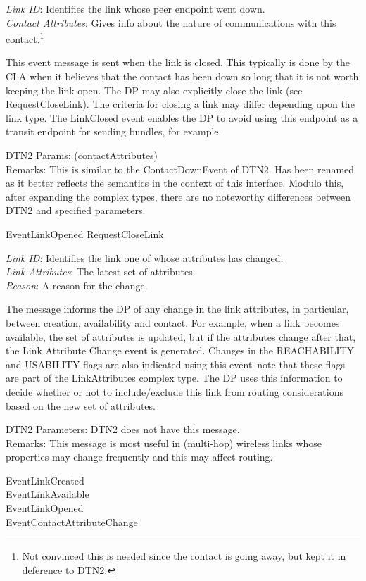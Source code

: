 {
\metP
    {\em Link ID}: Identifies the link whose peer endpoint went down.\\
    {\em Contact Attributes}: Gives info about the nature of communications 
    with this contact.\footnote{Not convinced this is
    needed since the contact is going away, but kept it in deference to DTN2.}

\metD
    This event message is sent when the link is closed. This typically
    is done by the CLA when it believes that the contact has been down
    so long that it is not worth keeping the link open. The DP may
    also explicitly close the link (see RequestCloseLink). The
    criteria for closing a link may differ depending upon the link
    type.  The LinkClosed event enables the DP to avoid using this
    endpoint as a transit endpoint for sending bundles, for example.

\metM
    DTN2 Params: (contactAttributes)\\
    Remarks: This is similar to the ContactDownEvent of DTN2. Has
    been renamed as it better reflects the semantics in the context of
    this interface. Modulo this, after expanding the complex types,
    there are no noteworthy differences between DTN2 and specified
    parameters.

\metR
    EventLinkOpened
    RequestCloseLink
}

    
{
\metP
    {\em Link ID}: Identifies the link one of whose attributes has changed.\\
    {\em Link Attributes}: The latest set of attributes.\\
    {\em Reason}: A reason for the change.

\metD
    The message informs the DP of any change in the link attributes,
    in particular, between creation, availability and contact. For
    example, when a link becomes available, the set of attributes is
    updated, but if the attributes change after that, the Link
    Attribute Change event is generated. Changes in the REACHABILITY
    and USABILITY flags are also indicated using this event--note
    that these flags are part of the LinkAttributes complex type.  The
    DP uses this information to decide whether or not to
    include/exclude this link from routing considerations based on the
    new set of attributes.

\metM
    DTN2 Parameters: DTN2 does not have this message. \\
    Remarks: This message is most useful in (multi-hop) wireless links 
    whose properties may change frequently and this may affect routing.

\metR
    EventLinkCreated\\
    EventLinkAvailable\\
    EventLinkOpened\\
    EventContactAttributeChange
}

